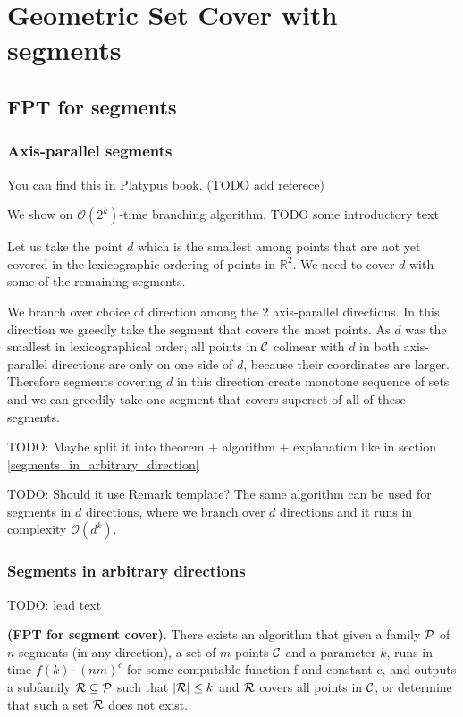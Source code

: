 \chapter{Geometric Set Cover with segments}

\section{FPT for segments}
\subsection{Axis-parallel segments}
You can find this in Platypus book. (TODO add referece)

We show on $\mathcal{O}(2^k)$-time branching algorithm.
TODO some introductory text

Let us take
the point $d$ which is the smallest 
among points that are not yet covered
in the lexicographic ordering
of points in $\mathbb{R}^2$.
We need to cover $d$ with some of the remaining segments.

We branch over choice of direction among the 2 axis-parallel directions.
In this direction we greedly take the segment that covers
the most points. As $d$ was the smallest
in lexicographical order, all points in $\mathcal{C}$ colinear with $d$
in both axis-parallel directions 
are only on one side of $d$, because their coordinates are larger.
Therefore
segments covering $d$ in this direction create monotone sequence
of sets and we can greedily take one segment that covers
superset of all of these segments.

TODO: Maybe split it into theorem + algorithm + explanation like in 
section
\ref{segments_in_arbitrary_direction}

TODO: Should it use Remark template?
The same algorithm can be used for segments in $d$ directions,
where we branch over $d$ directions and it runs in complexity $\mathcal{O}(d^k)$.

\subsection{Segments in arbitrary directions}
TODO: lead text

\label{segments_in_arbitrary_direction}
\begin{tw}{
	\label{segment_cover_fpt}
	\textbf{(FPT for segment cover)}.
	There exists an algorithm that given a family $\mathcal{P}$ of
	$n$ segments (in any direction),
	a set of $m$ points $\mathcal{C}$
	and a parameter $k$,
	runs in time $f(k) \cdot (nm)^c$ for some computable function f and constant c,
	and outputs a subfamily $\mathcal{R} \subseteq \mathcal{P}$
	such that $|\mathcal{R}| \le k$ and $\mathcal{R}$ covers all points in $\mathcal{C}$,
	or determine that such a set $\mathcal{R}$ does not exist.
}\end{tw}

